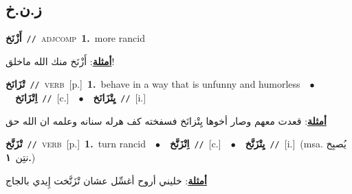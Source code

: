 \documentclass[10pt,a4paper,twoside]{article} %
\begin{document}
\begin{multicols}{2}
\vspace{-3mm}
\subsection*{\color{blue}\foreignlanguage{arabic}{ز.ن.خ}\color{blue}{}} 

{\setlength\topsep{0pt}\textbf{\foreignlanguage{arabic}{أَزْنَخ}}\ {\color{gray}\texttt{//}\color{black}}\ \textsc{adj\textunderscore comp}\ \textbf{1.}~more rancid\  \begin{flushright}\color{gray}\foreignlanguage{arabic}{\textbf{\underline{\foreignlanguage{arabic}{أمثلة}}}: أَزْنَخ منك الله ماخلق!}\end{flushright}\color{black}} \vspace{2mm}

{\setlength\topsep{0pt}\textbf{\foreignlanguage{arabic}{تْزَانَخ}}\ {\color{gray}\texttt{//}\color{black}}\ \textsc{verb}\ [p.]\ \textbf{1.}~behave in a way that is unfunny and humorless\ \ $\bullet$\ \ \setlength\topsep{0pt}\textbf{\foreignlanguage{arabic}{اِتْزَانَخ}}\ {\color{gray}\texttt{//}\color{black}}\ [c.]\ \ $\bullet$\ \ \setlength\topsep{0pt}\textbf{\foreignlanguage{arabic}{يِتْزَانَخ}}\ {\color{gray}\texttt{//}\color{black}}\ [i.]\  \begin{flushright}\color{gray}\foreignlanguage{arabic}{\textbf{\underline{\foreignlanguage{arabic}{أمثلة}}}: قعدت معهم وصار أخوها يِتْزانَخ فسفخته كف هرله سنانه وعلمه ان الله حق}\end{flushright}\color{black}} \vspace{2mm}

{\setlength\topsep{0pt}\textbf{\foreignlanguage{arabic}{تْزَنَّخ}}\ {\color{gray}\texttt{//}\color{black}}\ \textsc{verb}\ [p.]\ \textbf{1.}~turn rancid\ \ $\bullet$\ \ \setlength\topsep{0pt}\textbf{\foreignlanguage{arabic}{اِتْزَنَّخ}}\ {\color{gray}\texttt{//}\color{black}}\ [c.]\ \ $\bullet$\ \ \setlength\topsep{0pt}\textbf{\foreignlanguage{arabic}{يِتْزَنَّخ}}\ {\color{gray}\texttt{//}\color{black}}\ [i.]\ \color{gray}(msa. \foreignlanguage{arabic}{يُصبِخ نتِن}~\foreignlanguage{arabic}{\textbf{١.}})\color{black}\  \begin{flushright}\color{gray}\foreignlanguage{arabic}{\textbf{\underline{\foreignlanguage{arabic}{أمثلة}}}: خليني أروح أغسِّل عشان تْزَنَّخت إِيدي بالجاج}\end{flushright}\color{black}} \vspace{2mm}


\end{multicols}
\end{document}
